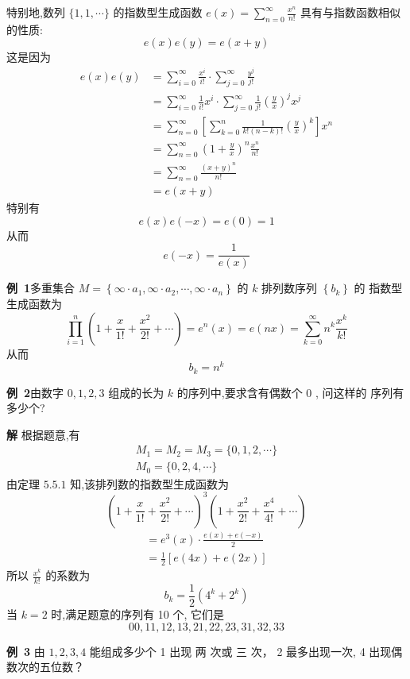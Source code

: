 \documentclass{report}
\begin{document}
特别地,数列 $\{1,1, \cdots\}$ 的指数型生成函数 $e(x)=\sum_{n=0}^{\infty} \frac{x^{n}}{n !}$ 具有与指数函数相似的性质:
$$
e(x) e(y)=e(x+y)
$$
这是因为
$$
\begin{aligned}
e(x) e(y) &=\sum_{i=0}^{\infty} \frac{x^{i}}{i !} \cdot \sum_{j=0}^{\infty} \frac{y^{j}}{j !} \\
&=\sum_{i=0}^{\infty} \frac{1}{i !} x^{i} \cdot \sum_{j=0}^{\infty} \frac{1}{j !}\left(\frac{y}{x}\right)^{j} x^{j} \\
&=\sum_{n=0}^{\infty}\left[\sum_{k=0}^{n} \frac{1}{k !(n-k) !}\left(\frac{y}{x}\right)^{k}\right] x^{n} \\
&=\sum_{n=0}^{\infty}\left(1+\frac{y}{x}\right)^{n} \frac{x^{n}}{n !} \\
&=\sum_{n=0}^{\infty} \frac{(x+y)^{n}}{n !} \\
&=e(x+y)
\end{aligned}
$$
特别有
$$
e(x) e(-x)=e(0)=1
$$
从而
$$
e(-x)=\frac{1}{e(x)}
$$

\noindent
\textbf{例\ 1}多重集合 $M=\left\{\infty \cdot a_{1}, \infty \cdot a_{2}, \cdots, \infty \cdot a_{n}\right\}$ 的 $k$ 排列数序列 $\left\{b_{k}\right\}$ 的 指数型生成函数为
$$
\prod_{i=1}^{n}\left(1+\frac{x}{1 !}+\frac{x^{2}}{2 !}+\cdots\right)=e^{n}(x)=e(n x)=\sum_{k=0}^{\infty} n^{k} \frac{x^{k}}{k !}
$$
从而
$$
b_{k}=n^{k}
$$

\noindent
\textbf{例\ 2}由数字 $0,1,2,3$ 组成的长为 $k$ 的序列中,要求含有偶数个 0 , 问这样的 序列有多少个?

\textbf{解  }根据题意,有
$$
\begin{array}{l}
M_{1}=M_{2}=M_{3}=\{0,1,2, \cdots\} \\
M_{0}=\{0,2,4, \cdots\}
\end{array}
$$
由定理 $5.5.1$ 知,该排列数的指数型生成函数为
$$
\left(1+\frac{x}{1 !}+\frac{x^{2}}{2 !}+\cdots\right)^{3}\left(1+\frac{x^{2}}{2 !}+\frac{x^{4}}{4 !}+\cdots\right)
$$
$$
\begin{array}{l}
=e^{3}(x) \cdot \frac{e(x)+e(-x)}{2} \\
=\frac{1}{2}[e(4 x)+e(2 x)]
\end{array}
$$
所以 $\frac{x^{k}}{k !}$ 的系数为
$$
b_{k}=\frac{1}{2}\left(4^{k}+2^{k}\right)
$$
当 $k=2$ 时,满足题意的序列有 10 个, 它们是
$$
00,11,12,13,21,22,23,31,32,33
$$

\noindent
\textbf{例\ 3} 由 $1,2,3,4$ 能组成多少个 1 出现 两 次或 三 次， 2 最多出现一次, 4 出现偶数次的五位数？
\end{document}
